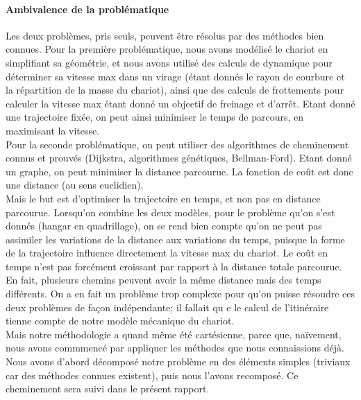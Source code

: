 \paragraph{Ambivalence de la problématique}
Les deux problèmes, pris seuls, peuvent être résolus par des méthodes bien connues. Pour la première problématique, nous avons modélisé le chariot en simplifiant sa géométrie, et nous avons utilisé des calculs de dynamique pour déterminer sa vitesse max dans un virage (étant donnés le rayon de courbure et la répartition de la masse du chariot), ainsi que des calculs de frottements pour calculer la vitesse max étant donné un objectif de freinage et d'arrêt. Etant donné une trajectoire fixée, on peut ainsi minimiser le temps de parcours, en maximisant la vitesse.\\
Pour la seconde problématique, on peut utiliser des algorithmes de cheminement connus et prouvés (Dijkstra, algorithmes génétiques, Bellman-Ford). Etant donné un graphe, on peut minimiser la distance parcourue. La fonction de coût est donc une distance (au sens euclidien).\\
Mais le but est d'optimiser la trajectoire en temps, et non pas en distance parcourue. Lorsqu'on combine les deux modèles, pour le problème qu'on s'est donnés (hangar en quadrillage), on se rend bien compte qu'on ne peut pas assimiler les variations de la distance aux variations du temps, puisque la forme de la trajectoire influence directement la vitesse max du chariot. Le coût en temps n'est pas forcément croissant par rapport à la distance totale parcourue. En fait, plusieurs chemins peuvent avoir la même distance mais des temps différents. On a en fait un problème trop complexe pour qu'on puisse résoudre ces deux problèmes de façon indépendante; il fallait qu e le calcul de l'itinéraire tienne compte de notre modèle mécanique du chariot.\\
Mais notre méthodologie a quand même été cartésienne, parce que, naïvement, nous avons commmencé par appliquer les méthodes que nous connaissions déjà. Nous avons d'abord décomposé notre problème en des éléments simples (triviaux car des méthodes connues existent), puis nous l'avons recomposé. Ce cheminement sera suivi dans le présent rapport.

